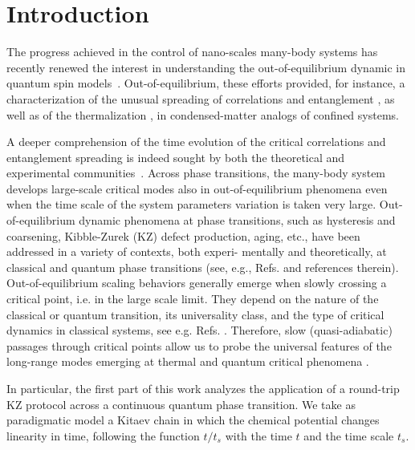 \chapter{Introduction}

The progress achieved in the control of nano-scales many-body systems has recently renewed the interest in understanding the out-of-equilibrium dynamic in quantum spin models~\cite{PSSV-2011-noneqcoll, GAN-2014-quantumsimulation}. Out-of-equilibrium, these efforts provided, for instance, a characterization of the unusual spreading of correlations and entanglement \cite{kormos2017real,lerose2020quasilocalized,tortora2020relaxation,lagnese2022quenches,scopa2022entanglement,castro2020entanglement,vovrosh2021confinement,rigobello2021entanglement}, as well as of the thermalization \cite{birnkammer2022prethermalization,james2019nonthermal,robinson2019signatures,chanda2020confinement}, in condensed-matter analogs of confined systems.

A deeper comprehension of the time evolution of the critical correlations and entanglement spreading is indeed sought by both the theoretical and experimental communities~\cite{ADM-2015-EntanglementReview}.
Across phase transitions, the many-body system develops large-scale critical modes also
in out-of-equilibrium phenomena even when the time scale of the system parameters variation
is taken very large.
Out-of-equilibrium dynamic phenomena at
phase transitions, such as hysteresis and coarsening,
Kibble-Zurek (KZ) 
\cite{kibble1976topology,kibble1980some,zurek1985cosmological,zurek1996cosmological}
defect production, aging, etc., have
been addressed in a variety of contexts, both experi-
mentally and theoretically, at classical and quantum
phase transitions (see, e.g., Refs. 
\cite{binder1987theory, cui2020experimentally, bray2002theory, weiler2008spontaneous,
dziarmaga2010dynamics, PSSV-2011-noneqcoll, ulm2013observation} 
and references therein). Out-of-equilibrium scaling behaviors generally
emerge when slowly crossing a critical point, i.e. in
the large scale limit. They depend on the nature of the
classical or quantum transition, its universality class,
and the type of critical dynamics in classical systems, see e.g. Refs. 
\cite{kibble1980some, zurek1996cosmological, dziarmaga2010dynamics, PSSV-2011-noneqcoll}. 
Therefore, slow (quasi-adiabatic) passages through critical points allow us to
probe the universal features of the long-range modes
emerging at thermal and quantum critical phenomena \cite{tarantelli2022out}. 

In particular, the first part of this
work analyzes the application of a round-trip KZ protocol across a continuous quantum
phase transition. We take as paradigmatic model a Kitaev chain \cite{Kitaev_2001} in 
which the chemical potential changes linearity in time, following the function $t/t_s$ 
with the time $t$ and the time scale $t_s$.\\

